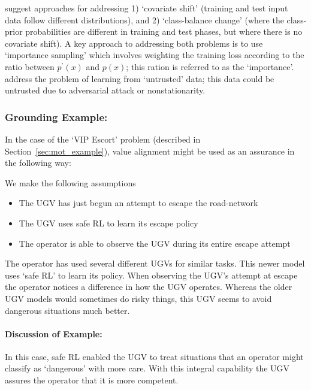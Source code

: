 \citet{Sugiyama2013-ci} suggest approaches for addressing 1) `covariate shift' (training and test input data follow different distributions), and 2) `class-balance change' (where the class-prior probabilities are different in training and test phases, but where there is no covariate shift). A key approach to addressing both problems is to use `importance sampling' which involves weighting the training loss according to the ratio between $p^\prime(x)$ and $p(x)$; this ration is referred to as the `importance'. \citet{Charikar2017-kr} address the problem of learning from `untrusted' data; this data could be untrusted due to adversarial attack or nonstationarity.


\subsubsection{Grounding Example:}
In the case of the `VIP Escort' problem (described in Section~\ref{sec:mot_example}), value alignment might be used as an assurance in the following way:

We make the following assumptions

\begin{itemize}
    \item The UGV has just begun an attempt to escape the road-network
    \item The UGV uses safe RL to learn its escape policy
    \item The operator is able to observe the UGV during its entire escape attempt
\end{itemize}

The operator has used several different UGVs for similar tasks. This newer model uses `safe RL' to learn its policy. When observing the UGV's attempt at escape the operator notices a difference in how the UGV operates. Whereas the older UGV models would sometimes do risky things, this UGV seems to avoid dangerous situations much better. 

\paragraph{\textbf{Discussion of Example:}} In this case, safe RL enabled the UGV to treat situations that an operator might classify as `dangerous' with more care. With this integral capability the UGV assures the operator that it is more competent.
